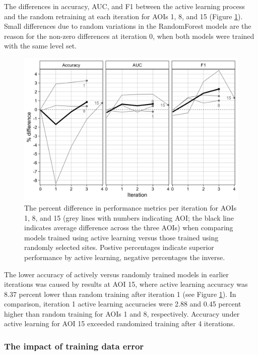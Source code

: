 \documentclass[
  11pt,
  a4paper]{article}
\begin{document}
The differences in accuracy, AUC, and F1 between the active learning
process and the random retraining at each iteration for AOIs 1, 8, and
15 (Figure \ref{fig:randomvactive}). Small differences due to random
variations in the RandomForest models are the reason for the non-zero
differences at iteration 0, when both models were trained with the same
level set.

\begin{figure}[!ht]

{\centering \includegraphics[width=0.9\linewidth,]{figures/si_random_vs_active} 

}

\caption{The percent difference in performance metrics per iteration for AOIs 1, 8, and 15 (grey lines with numbers indicating AOI; the black line indicates average difference across the three AOIs) when comparing models trained using active learning versus those trained using randomly selected sites. Postive percentages indicate superior performance by active learning, negative percentages the inverse.}\label{fig:randomvactive}
\end{figure}

The lower accuracy of actively versus randomly trained models in earlier
iterations was caused by results at AOI 15, where active learning
accuracy was 8.37 percent lower than random training after iteration 1
(see Figure \ref{fig:randomvactive}). In comparison, iteration 1 active
learning accuracies were 2.88 and 0.45 percent higher than random
training for AOIs 1 and 8, respectively. Accuracy under active learning
for AOI 15 exceeded randomized training after 4 iterations.

\hypertarget{the-impact-of-training-data-error}{%
\subsubsection{The impact of training data
error}\label{the-impact-of-training-data-error}}
\end{document}
